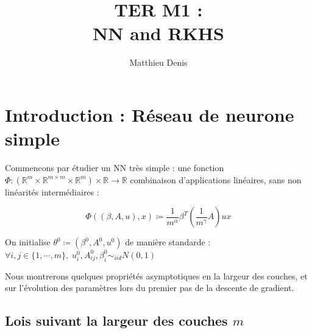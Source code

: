 \documentclass[a4paper, 11pt, french]{article}
\title{TER M1 : \\ NN and RKHS}
\author{Matthieu Denis}
\begin{document}
	
	\maketitle
	\newpage
	
	\tableofcontents
	\newpage
	
	\section*{Introduction : Réseau de neurone simple}
	
	Commencons par étudier un NN très simple : une fonction
	$\Phi : (\mathbb{R}^m \times \mathbb{R}^{m \times m} \times \mathbb{R}^m) \times \mathbb{R} \to \mathbb{R}$ combinaison d'applications linéaires, sans non linéarités  intermédiaires  :
	
	\[ \Phi ((\beta, A, u), x) \coloneqq \frac{1}{m^{\alpha}} \beta^T
		 \left( \frac{1}{m^{\gamma}} A \right) u x \]
		 
	On initialise $\theta^0 \coloneqq (\beta^0, A^0, u^0)$ de manière standarde : 
	$ \forall i,j \in \{1, \cdots, m\} , \; u_i^0, A_{ij}^0, \beta_i^0 \sim_{iid} N(0, 1)$
	
	Nous montrerons quelques propriétés asymptotiques en la largeur des couches, et sur l'évolution des paramètres lors du premier pas de la descente de gradient.
	
	\subsection*{Lois suivant la largeur des couches $m$}
	
\end{document}
